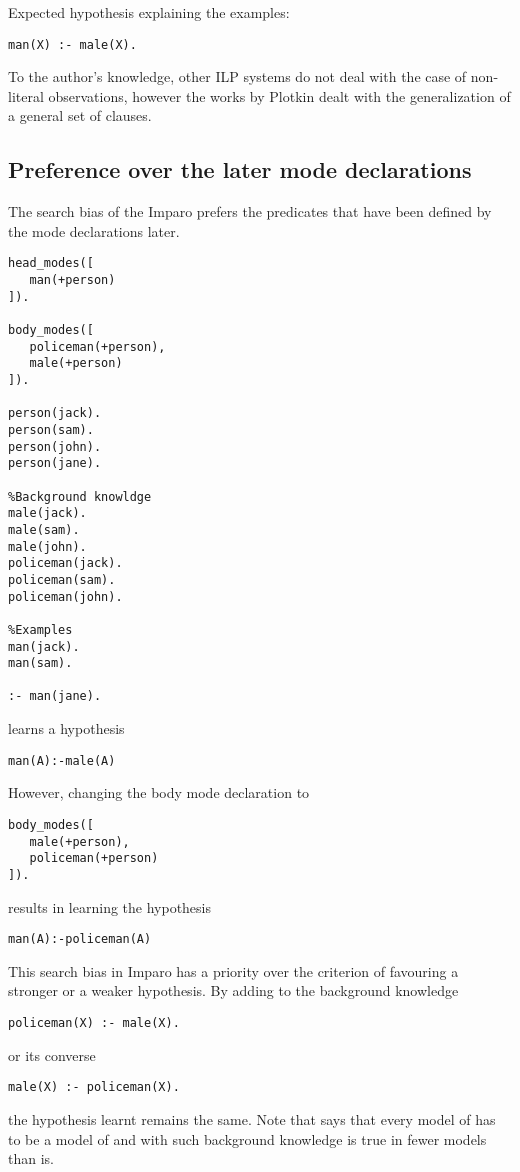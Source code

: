 Expected hypothesis explaining the examples:

\begin{lstlisting}
man(X) :- male(X).
\end{lstlisting}

To the author's knowledge, other ILP systems do not deal with the case of non-literal observations, however the works by Plotkin dealt with the generalization of a general set of clauses.

\subsection{Preference over the later mode declarations}
The search bias of the Imparo prefers the predicates that have been defined by the mode declarations later.

\begin{lstlisting}
head_modes([
   man(+person)
]).

body_modes([
   policeman(+person),
   male(+person)
]).

person(jack).
person(sam).
person(john).
person(jane).

%Background knowldge
male(jack).
male(sam).
male(john).
policeman(jack).
policeman(sam).
policeman(john).

%Examples
man(jack).
man(sam).

:- man(jane).
\end{lstlisting}
learns a hypothesis
\begin{lstlisting}
man(A):-male(A)
\end{lstlisting}
However, changing the body mode declaration to
\begin{lstlisting}
body_modes([   
   male(+person),
   policeman(+person)
]).
\end{lstlisting}
results in learning the hypothesis
\begin{lstlisting}
man(A):-policeman(A)
\end{lstlisting}

This search bias in Imparo has a priority over the criterion of favouring a stronger or a weaker hypothesis. By adding to the background knowledge
\begin{lstlisting}
policeman(X) :- male(X).
\end{lstlisting}
or its converse
\begin{lstlisting}
male(X) :- policeman(X).
\end{lstlisting}
the hypothesis learnt remains the same.
Note that  says that every model of  has to be a model of  and with such background knowledge  is true in fewer models than  is.


